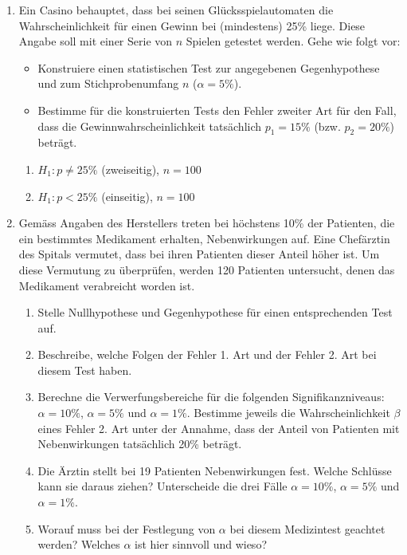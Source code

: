 \begin{ueb}
    {}{}
    \begin{enumerate}
        \item Ein Casino behauptet, dass bei seinen Glücksspielautomaten die Wahrscheinlichkeit für einen Gewinn bei (mindestens) 25\% liege. Diese Angabe soll mit einer Serie von \( n \) Spielen getestet werden. Gehe wie folgt vor:
              \begin{itemize}
                  \item Konstruiere einen statistischen Test zur angegebenen Gegenhypothese und zum Stichprobenumfang \( n \) (\( \alpha = 5\% \)).
                  \item Bestimme für die konstruierten Tests den Fehler zweiter Art für den Fall, dass die Gewinnwahrscheinlichkeit tatsächlich \( p_1 = 15\% \) (bzw. \( p_2 = 20\% \)) beträgt.
              \end{itemize}
              \begin{enumerate}
                  \item \( H_1 : p \neq 25\% \) (zweiseitig), \( n = 100 \)
                  \item \( H_1 : p < 25\% \) (einseitig), \( n = 100 \)
              \end{enumerate}
        \item Gemäss Angaben des Herstellers treten bei höchstens 10\% der Patienten, die ein bestimmtes Medikament erhalten, Nebenwirkungen auf. Eine Chefärztin des Spitals vermutet, dass bei ihren Patienten dieser Anteil höher ist. Um diese Vermutung zu überprüfen, werden 120 Patienten untersucht, denen das Medikament verabreicht worden ist.
              \begin{enumerate}
                  \item Stelle Nullhypothese und Gegenhypothese für einen entsprechenden Test auf.
                  \item Beschreibe, welche Folgen der Fehler 1. Art und der Fehler 2. Art bei diesem Test haben.
                  \item Berechne die Verwerfungsbereiche für die folgenden Signifikanzniveaus: \(\alpha = 10\%\), \(\alpha = 5\%\) und \(\alpha = 1\%\). Bestimme jeweils die Wahrscheinlichkeit \(\beta\) eines Fehler 2. Art unter der Annahme, dass der Anteil von Patienten mit Nebenwirkungen tatsächlich 20\% beträgt.
                  \item Die Ärztin stellt bei 19 Patienten Nebenwirkungen fest. Welche Schlüsse kann sie daraus ziehen? Unterscheide die drei Fälle \(\alpha = 10\%\), \(\alpha = 5\%\) und \(\alpha = 1\%\).
                  \item Worauf muss bei der Festlegung von \(\alpha\) bei diesem Medizintest geachtet werden? Welches \(\alpha\) ist hier sinnvoll und wieso?
              \end{enumerate}
    \end{enumerate}

\end{ueb}

